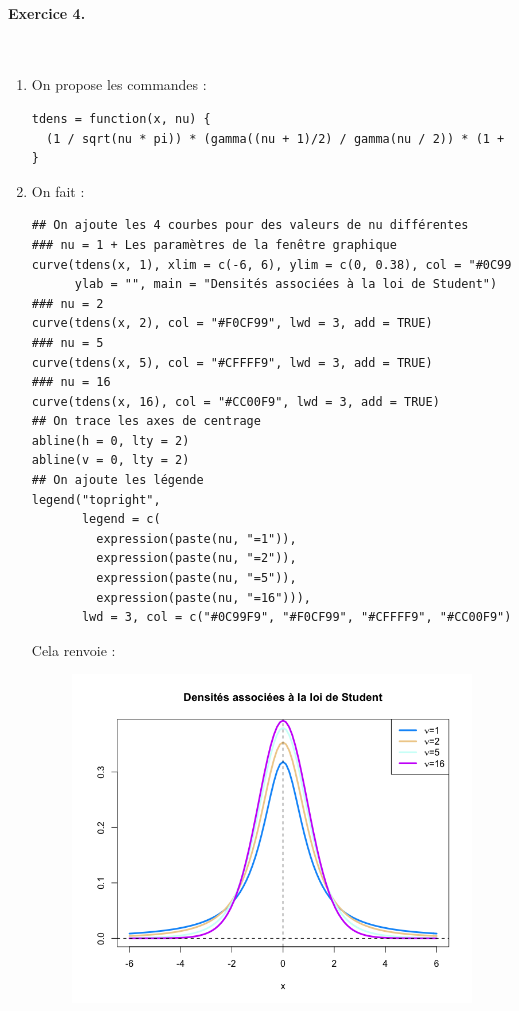 \paragraph{Exercice 4. }\textcolor{white}{.}\newline

\begin{enumerate}
\item On propose les commandes :
\begin{lstlisting}[language=html]
tdens = function(x, nu) {
  (1 / sqrt(nu * pi)) * (gamma((nu + 1)/2) / gamma(nu / 2)) * (1 + x^2 / nu)^(-(nu + 1) / 2)
}
\end{lstlisting}
\item On fait :
\begin{lstlisting}[language=html]
## On ajoute les 4 courbes pour des valeurs de nu différentes
### nu = 1 + Les paramètres de la fenêtre graphique
curve(tdens(x, 1), xlim = c(-6, 6), ylim = c(0, 0.38), col = "#0C99F9", lwd = 3,
      ylab = "", main = "Densités associées à la loi de Student")
### nu = 2
curve(tdens(x, 2), col = "#F0CF99", lwd = 3, add = TRUE)
### nu = 5
curve(tdens(x, 5), col = "#CFFFF9", lwd = 3, add = TRUE)
### nu = 16
curve(tdens(x, 16), col = "#CC00F9", lwd = 3, add = TRUE)
## On trace les axes de centrage
abline(h = 0, lty = 2)
abline(v = 0, lty = 2)
## On ajoute les légende
legend("topright",
       legend = c(
         expression(paste(nu, "=1")),
         expression(paste(nu, "=2")),
         expression(paste(nu, "=5")),
         expression(paste(nu, "=16"))),
       lwd = 3, col = c("#0C99F9", "#F0CF99", "#CFFFF9", "#CC00F9"))
\end{lstlisting}
Cela renvoie :
\begin{figure}[H]\begin{center}\includegraphics[scale=0.4]{ilu/gra92.png}\end{center}\end{figure}
\end{enumerate}

